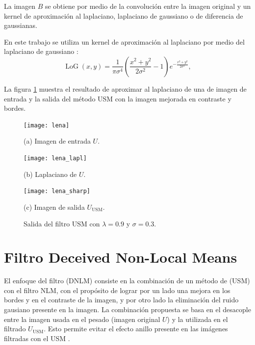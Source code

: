 La imagen $B$ se obtiene por medio de la convolución entre la imagen original y un kernel de aproximación al laplaciano, laplaciano de gaussiano o de diferencia de gaussianas.


En este trabajo se utiliza un kernel de aproximación al laplaciano por medio del laplaciano de gaussiano \cite{sotak1989laplacian}:
%
\begin{equation}
\label{eq:log}
\operatorname{LoG}(x,y) = \frac{1}{\pi\sigma^4}\left(\frac{x^2+y^2}{2\sigma^2} - 1\right)e^{-\frac{x^2+y^2}{2\sigma^2}},
\end{equation}

La figura \ref{fig:exampleUSM} muestra el resultado de aproximar al laplaciano de una de imagen de entrada y la salida del método USM con la imagen mejorada en contraste y bordes. 

\begin{figure}[htb]
%
\begin{minipage}{0.25\textwidth}
  \centering
  \centerline{\texttt{[image: lena]}}
  \centerline{(a) Imagen de entrada $U$.}\medskip
\end{minipage}
\hfill
\begin{minipage}{0.25\textwidth}
  \centering
  \centerline{\texttt{[image: lena\_lapl]}}
  \centerline{(b) Laplaciano de $U$.}
\end{minipage}
\hfill
\begin{minipage}{0.25\textwidth}
  \centering
  \centerline{\texttt{[image: lena\_sharp]}}
  \centerline{(c) Imagen de salida $U_{\textrm{USM}}$.}\medskip
\end{minipage}
%
\caption[Ejemplo de mejora en imagen con ]{Salida del filtro USM con $\lambda = 0.9$ y $\sigma = 0.3$. \label{fig:exampleUSM}}
%
\end{figure}


\section{Filtro Deceived Non-Local Means}
\label{ch:marco_dnlm}


El enfoque del filtro  (DNLM) consiste en la combinación de un método de  (USM) con el filtro NLM, con el propósito de lograr por un lado una mejora en los bordes y en el contraste de la imagen, y por otro lado la eliminación del ruido gausiano  presente en la imagen. La combinación propuesta se basa en el desacople entre la imagen usada en el pesado (imagen original $U$) y la utilizada en el filtrado $U_{\textrm{USM}}$. Esto permite evitar el efecto anillo presente en las im\'agenes filtradas con el USM \cite{calderon2015dewaff}.

